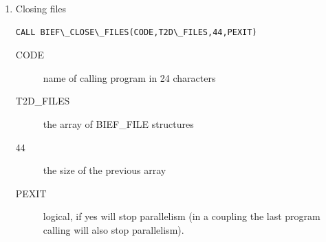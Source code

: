 \begin{enumerate}
\item Closing files

\begin{lstlisting}[language=TelFortran]
CALL BIEF\_CLOSE\_FILES(CODE,T2D\_FILES,44,PEXIT)
\end{lstlisting}
\begin{description}
  \item [CODE] name of calling program in 24 characters
  \item [T2D\_FILES] the array of BIEF\_FILE structures
  \item [44] the size of the previous array
  \item [PEXIT] logical, if yes will stop parallelism (in a coupling the last
    program calling  will also stop parallelism).
\end{description}
\end{enumerate}

